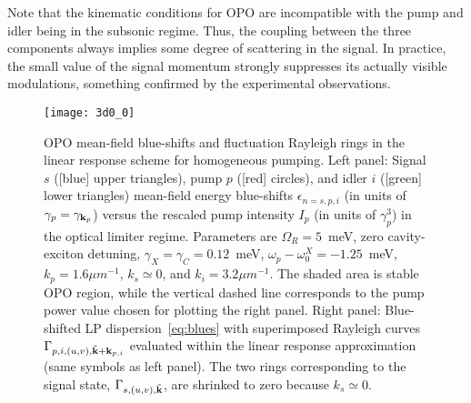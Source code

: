 Note that the kinematic conditions for OPO are incompatible with the
pump and idler being in the subsonic regime. Thus, the coupling
between the three components always implies some degree of scattering
in the signal. In practice, the small value of the signal momentum
strongly suppresses its actually visible modulations, something
confirmed by the experimental observations.


%
\begin{figure}[tb]
\centering
\texttt{[image: 3d0\_0]} %
\caption{OPO mean-field blue-shifts and fluctuation
  Rayleigh rings in the linear response scheme for homogeneous
  pumping. Left panel: Signal $s$ ([blue] upper triangles), pump $p$
  ([red] circles), and idler $i$ ([green] lower triangles) mean-field
  energy blue-shifts $\epsilon_{n=s,p,i}$ (in units of $\gamma_p =
  \gamma_{\mathbf{k}_p}$) versus the rescaled pump intensity $I_p$ (in
  units of $\gamma_p^3$) in the optical limiter regime. Parameters are
  $\Omega_R=5$~meV, zero cavity-exciton detuning, $\gamma_X = \gamma_C
  = 0.12$~meV, $\omega_p - \omega_0^X = -1.25$~meV, $k_p=1.6{\mu
    m}^{-1}$, $k_s \simeq 0$, and $k_i=3.2{\mu m}^{-1}$.  The shaded
  area is stable OPO region, while the vertical dashed line
  corresponds to the pump power value chosen for plotting the right
  panel. Right panel: Blue-shifted LP dispersion~\eqref{eq:blues} with
  superimposed Rayleigh curves $\Gamma_{p,i,(u,v), \tilde{\mathbf{k}} +
    \mathbf{k}_{p, i}}$ evaluated within the linear response
  approximation (same symbols as left panel). The two rings
  corresponding to the signal state, $\Gamma_{s,(u,v),
    \tilde{\mathbf{k}}}$, are shrinked to zero because $k_s \simeq 0$.}
\label{fig:spect}
\end{figure}
%

